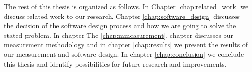 The rest of this thesis is organized as follows. In Chapter \ref{chap:related_work} we discuss related work to our research. Chapter \ref{chap:software_design} discusses the decision of the software design process and how we are going to solve the stated problem.  In chapter 
The \ref{chap:mmeasurement}. chapter discusses our measurement methodology and in chapter \ref{chap:results} we present the results of our measurement and software design. In chapter \ref{chap:conclusion} we conclude this thesis and identify possibilities for future research and improvements.

